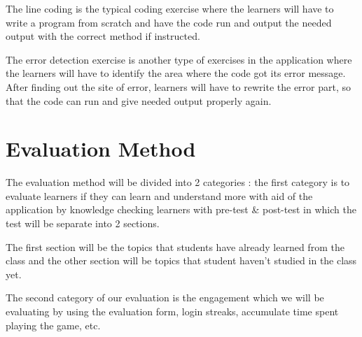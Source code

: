 The line coding is the typical coding exercise where the learners will have to write a program from scratch and have the code run and output the needed output with the correct method if instructed.

The error detection exercise is another type of exercises in the application where the learners will have to identify the area where the code got its error message. After finding out the site of error, learners will have to rewrite the error part, so that the code can run and give needed output properly again.

\section{Evaluation Method}
The evaluation method will be divided into 2 categories : the first category is to evaluate learners if they can learn and understand more with aid of the application by knowledge checking learners with pre-test \& post-test in which the test will be separate into 2 sections. 

The first section will be the topics that students have already learned from the class and the other section will be topics that student haven't studied in the class yet. 

The second category of our evaluation is the engagement which we will be evaluating by using the evaluation form, login streaks, accumulate time spent playing the game, etc.